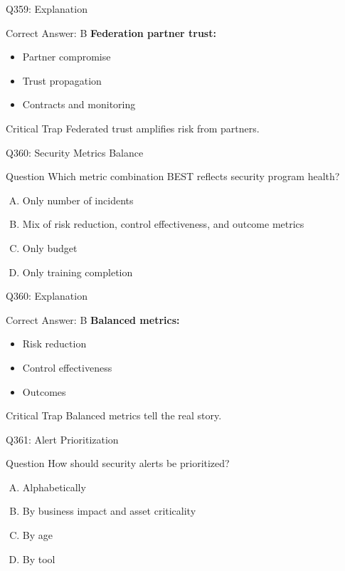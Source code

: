 \documentclass{beamer}
\begin{document}
	\begin{frame}{Q359: Explanation}
		\begin{block}{Correct Answer: B}
			\textbf{Federation partner trust:}
			\begin{itemize}
				\item Partner compromise
				\item Trust propagation
				\item Contracts and monitoring
			\end{itemize}
		\end{block}
		\begin{alertblock}{Critical Trap}
			Federated trust amplifies risk from partners.
		\end{alertblock}
	\end{frame}
	
	\begin{frame}{Q360: Security Metrics Balance}
		\begin{block}{Question}
			Which metric combination BEST reflects security program health?
		\end{block}
		\begin{enumerate}[(A)]
			\item Only number of incidents
			\item Mix of risk reduction, control effectiveness, and outcome metrics
			\item Only budget
			\item Only training completion
		\end{enumerate}
	\end{frame}
	
	\begin{frame}{Q360: Explanation}
		\begin{block}{Correct Answer: B}
			\textbf{Balanced metrics:}
			\begin{itemize}
				\item Risk reduction
				\item Control effectiveness
				\item Outcomes
			\end{itemize}
		\end{block}
		\begin{alertblock}{Critical Trap}
			Balanced metrics tell the real story.
		\end{alertblock}
	\end{frame}
	
	\begin{frame}{Q361: Alert Prioritization}
		\begin{block}{Question}
			How should security alerts be prioritized?
		\end{block}
		\begin{enumerate}[(A)]
			\item Alphabetically
			\item By business impact and asset criticality
			\item By age
			\item By tool
		\end{enumerate}
	\end{frame}
	
\end{document}
